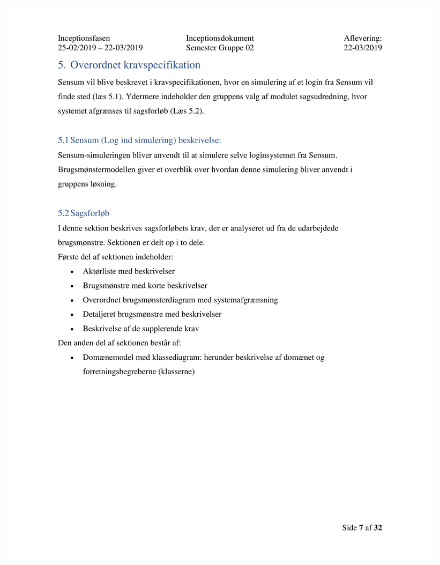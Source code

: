 \begin{figure}[hb]
  \includegraphics[scale = 0.33]{./PNG/Inceptions/Gruppe 02 + InceptionsDokument-08.jpg} 
\end{figure}

